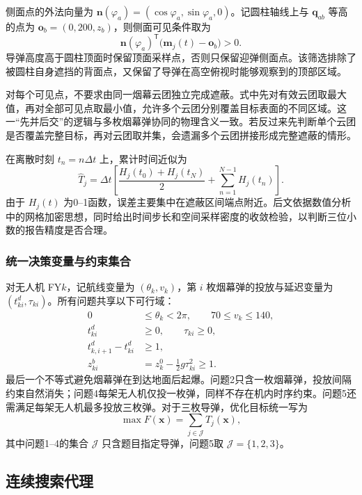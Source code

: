 \documentclass[12pt,a4paper]{ctexart}
\begin{document}
侧面点的外法向量为 $\bm n(\varphi_a)=(\cos\varphi_a,\sin\varphi_a,0)$。记圆柱轴线上与 $\bm q_{ab}$ 等高的点为 $\bm o_b=(0,200,z_b)$，则侧面可见条件取为
\begin{equation}
\bm n(\varphi_a)^{\mathsf T}\bigl(\bm m_j(t)-\bm o_b\bigr)>0.
\end{equation}
导弹高度高于圆柱顶面时保留顶面采样点，否则只保留迎弹侧面点。该筛选排除了被圆柱自身遮挡的背面点，又保留了导弹在高空俯视时能够观察到的顶部区域。

对每个可见点，不要求由同一烟幕云团独立完成遮蔽。式中先对有效云团取最大值，再对全部可见点取最小值，允许多个云团分别覆盖目标表面的不同区域。这一“先并后交”的逻辑与多枚烟幕弹协同的物理含义一致。若反过来先判断单个云团是否覆盖完整目标，再对云团取并集，会遗漏多个云团拼接形成完整遮蔽的情形。

在离散时刻 $t_n=n\Delta t$ 上，累计时间近似为
\begin{equation}
\widehat T_j=\Delta t\left[\frac{H_j(t_0)+H_j(t_N)}{2}
+\sum_{n=1}^{N-1}H_j(t_n)\right].
\end{equation}
由于 $H_j(t)$ 为0--1函数，误差主要集中在遮蔽区间端点附近。后文依据数值分析中的网格加密思想\cite{numerical}，同时给出时间步长和空间采样密度的收敛检验，以判断三位小数的报告精度是否合理。

\subsubsection{统一决策变量与约束集合}

对无人机 FY$k$，记航线变量为 $(\theta_k,v_k)$，第 $i$ 枚烟幕弹的投放与延迟变量为 $(t_{ki}^{d},\tau_{ki})$。所有问题共享以下可行域：
\begin{align}
0&\le \theta_k<2\pi,\qquad 70\le v_k\le140,\\
t_{ki}^{d}&\ge0,\qquad \tau_{ki}\ge0,\\
t_{k,i+1}^{d}-t_{ki}^{d}&\ge1,\\
z_{ki}^{b}&=z_k^0-\frac12g\tau_{ki}^2\ge1.
\end{align}
最后一个不等式避免烟幕弹在到达地面后起爆。问题2只含一枚烟幕弹，投放间隔约束自然消失；问题4每架无人机仅投一枚弹，同样不存在机内时序约束。问题5还需满足每架无人机最多投放三枚弹。对于三枚导弹，优化目标统一写为
\begin{equation}
\max F(\bm x)=\sum_{j\in\mathcal J}T_j(\bm x),
\end{equation}
其中问题1--4的集合 $\mathcal J$ 只含题目指定导弹，问题5取 $\mathcal J=\{1,2,3\}$。

\subsection{连续搜索代理}
\end{document}
